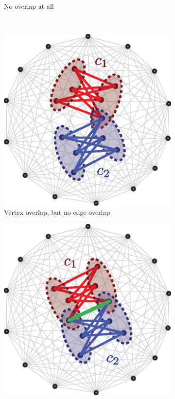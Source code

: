 \begin{figure}[th!]
\begin{subfigure}[b]{.48\textwidth}
      \caption{No overlap at all}
      \label{fig:ch_rem_smbp_illustration-1}
  \end{subfigure}
  \\[.5cm]
  \begin{subfigure}[b]{.48\textwidth}
      \includegraphics[width=\linewidth]{figures/ch_smbp_and_rem/different_solution_overlaps_2}
      \caption{Vertex overlap, but no edge overlap}
      \label{fig:ch_rem_smbp_illustration-2}
  \end{subfigure}
  \hfill
  \begin{subfigure}[b]{.48\textwidth}
      \includegraphics[width=\linewidth]{figures/ch_smbp_and_rem/different_solution_overlaps_3}

\end{subfigure}
\end{figure}
